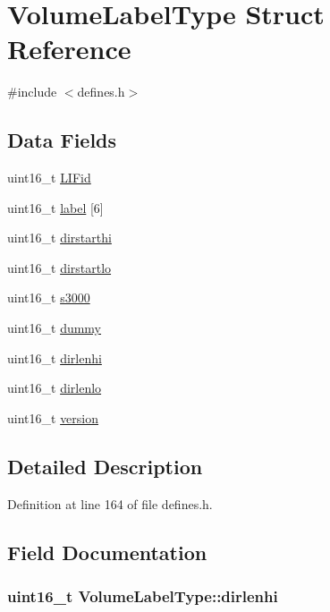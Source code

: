\hypertarget{structVolumeLabelType}{\section{Volume\-Label\-Type Struct Reference}
\label{structVolumeLabelType}
}


{\ttfamily \#include $<$defines.\-h$>$}

\subsection*{Data Fields}
\begin{DoxyCompactItemize}
\item 
uint16\-\_\-t \hyperlink{structVolumeLabelType_a16bdde2d19114ac3238477c29fe75b4a}{L\-I\-Fid}
\item 
uint16\-\_\-t \hyperlink{structVolumeLabelType_a265fc834b203868cc48482a8be64f60c}{label} \mbox{[}6\mbox{]}
\item 
uint16\-\_\-t \hyperlink{structVolumeLabelType_aac87a089bec0cf282bf23038937d7635}{dirstarthi}
\item 
uint16\-\_\-t \hyperlink{structVolumeLabelType_a193c89f442656a080244f284f1bc008a}{dirstartlo}
\item 
uint16\-\_\-t \hyperlink{structVolumeLabelType_ac7659e37fbb2bcb0b66c0a0172f9b16c}{s3000}
\item 
uint16\-\_\-t \hyperlink{structVolumeLabelType_affbd520c08374524f13708acc05f3f4e}{dummy}
\item 
uint16\-\_\-t \hyperlink{structVolumeLabelType_a6fa349ef78a7ea0a3006e0c1f4f3a155}{dirlenhi}
\item 
uint16\-\_\-t \hyperlink{structVolumeLabelType_ae1c5205294bf4588b931057d03853d66}{dirlenlo}
\item 
uint16\-\_\-t \hyperlink{structVolumeLabelType_a59f56fd1f28549bc625aeaaa57c8d0d2}{version}
\end{DoxyCompactItemize}


\subsection{Detailed Description}


Definition at line 164 of file defines.\-h.



\subsection{Field Documentation}
\hypertarget{structVolumeLabelType_a6fa349ef78a7ea0a3006e0c1f4f3a155}{
\subsubsection[{dirlenhi}]{\setlength{\rightskip}{0pt plus 5cm}uint16\-\_\-t Volume\-Label\-Type\-::dirlenhi}}\label{structVolumeLabelType_a6fa349ef78a7ea0a3006e0c1f4f3a155}


